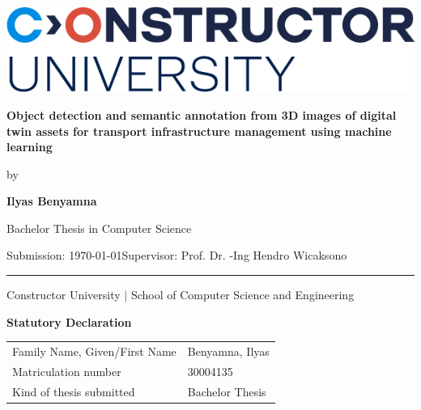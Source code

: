 \documentclass[a4paper,11pt,oneside]{article}
\newcommand{\mylastname}{Benyamna}
\newcommand{\myfirstname}{Ilyas}
\newcommand{\mynumber}{30004135}
\newcommand{\myname}{\myfirstname{} \mylastname{}}
\newcommand{\mytitle}{Object detection and semantic annotation from 3D images of digital 
twin assets for transport infrastructure management using machine 
learning}
\newcommand{\mysupervisor}{Prof. Dr. -Ing Hendro Wicaksono}
\begin{document}

  \thispagestyle{empty}

  \begin{flushright}
    \includegraphics[scale=0.8]{bsc-logo}
  \end{flushright}
  \vspace*{40mm}
  \begin{center}
    \huge
    \textbf{\mytitle}
  \end{center}
  \vspace*{4mm}
  \begin{center}
   \Large by
  \end{center}
  \vspace*{4mm}
  \begin{center}
    \LARGE
    \textbf{\myname}
  \end{center}
  \vspace*{20mm}
  \begin{center}
    \Large
    Bachelor Thesis in Computer Science
  \end{center}
  \vfill
  \begin{flushleft}
    \large
    Submission: \today \hfill Supervisor: \mysupervisor \\
    \rule{\textwidth}{1pt}
  \end{flushleft}
  \begin{center}
    Constructor University $|$ School of Computer Science and Engineering
  \end{center}

  \newpage
  \thispagestyle{empty}

  \begin{center}
    \Large \textbf{Statutory Declaration}
    \vspace*{8mm}
  \end{center}

  \begin{center}
    \begin{tabular}{|l|p{85mm}|}
      \hline
      Family Name, Given/First Name & \mylastname, \myfirstname \\
      Matriculation number & \mynumber \\
      Kind of thesis submitted & Bachelor Thesis \\
      \hline
    \end{tabular}
    \vspace*{8mm}
  \end{center}
\end{document}
